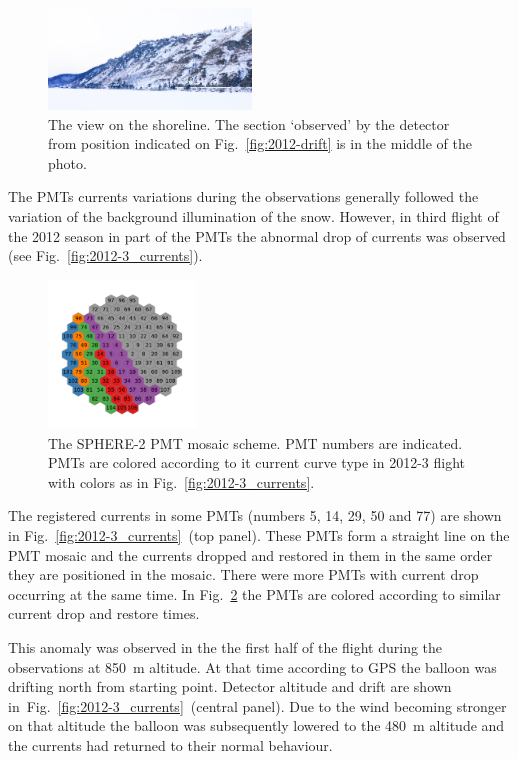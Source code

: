 \documentclass[final,5p,times,twocolumn]{elsarticle}
\begin{document}
\begin{figure}[tb]
    \includegraphics[width=0.48\textwidth]{DSC_7256_1.jpg}
    \caption{The view on the shoreline. The section `observed' by the detector from position indicated on Fig.~\ref{fig:2012-drift} is in the middle of the photo.}
    \label{fig:2012--shore-view}
\end{figure}

The PMTs currents variations during the observations generally followed the variation of the background illumination of the snow. However, in third flight of the 2012 season in part of the PMTs the abnormal drop of currents was observed (see Fig.~\ref{fig:2012-3_currents}).

\begin{figure}[tb]
\centering
    \includegraphics[width=0.35\textwidth]{2012-3_retina_all.pdf}
    \caption{The SPHERE-2 PMT mosaic scheme. PMT numbers are indicated. PMTs are colored according to it current curve type in 2012-3 flight with colors as in Fig.~\ref{fig:2012-3_currents}.}
    \label{fig:2012-3_shore_image}
\end{figure}

The registered currents in some PMTs (numbers 5, 14, 29, 50 and 77) are shown in Fig.~\ref{fig:2012-3_currents}~(top panel). These PMTs form a straight line on the PMT mosaic and the currents dropped and restored in them in the same order they are positioned in the mosaic. There were more PMTs with current drop occurring at the same time. In Fig.~\ref{fig:2012-3_shore_image} the PMTs are colored according to similar current drop and restore times.

This anomaly was observed in the the first half of the flight during the observations at 850~m altitude. At that time according to GPS the balloon was drifting north from starting point. Detector altitude and drift are shown in~Fig.~\ref{fig:2012-3_currents}~(central panel). Due to the wind becoming stronger on that altitude the balloon was subsequently lowered to the 480~m altitude and the currents had returned to their normal behaviour. 
\end{document}
